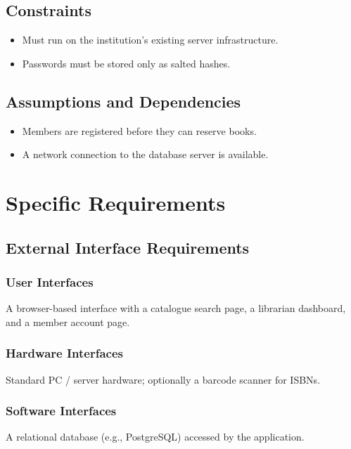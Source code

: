 \documentclass[11pt,a4paper]{article}
\begin{document}
\subsection{Constraints}
\begin{itemize}[leftmargin=*]
  \item Must run on the institution's existing server infrastructure.
  \item Passwords must be stored only as salted hashes.
\end{itemize}

\subsection{Assumptions and Dependencies}
\begin{itemize}[leftmargin=*]
  \item Members are registered before they can reserve books.
  \item A network connection to the database server is available.
\end{itemize}

\section{Specific Requirements}

\subsection{External Interface Requirements}
\subsubsection{User Interfaces}
A browser-based interface with a catalogue search page, a librarian dashboard,
and a member account page.
\subsubsection{Hardware Interfaces}
Standard PC / server hardware; optionally a barcode scanner for ISBNs.
\subsubsection{Software Interfaces}
A relational database (e.g., PostgreSQL) accessed by the application.
\end{document}
